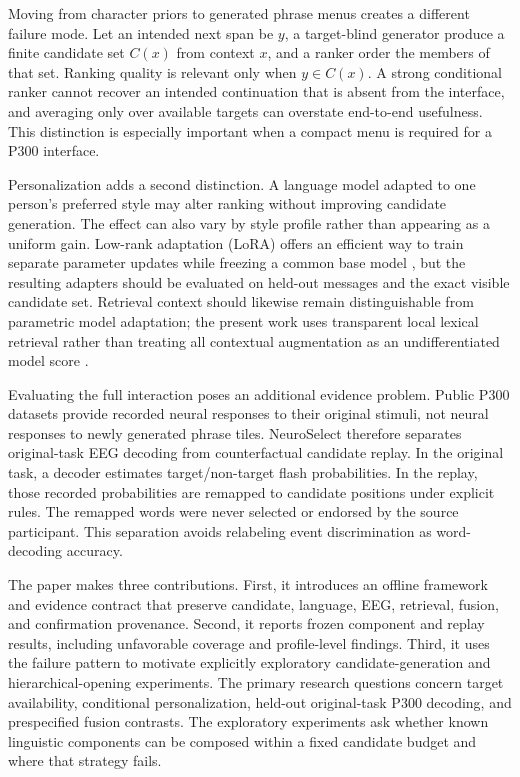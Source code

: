 \documentclass[11pt]{article}
\begin{document}
Moving from character priors to generated phrase menus creates a different failure mode. Let an intended next span be $y$, a target-blind generator produce a finite candidate set $C(x)$ from context $x$, and a ranker order the members of that set. Ranking quality is relevant only when $y \in C(x)$. A strong conditional ranker cannot recover an intended continuation that is absent from the interface, and averaging only over available targets can overstate end-to-end usefulness. This distinction is especially important when a compact menu is required for a P300 interface.


Personalization adds a second distinction. A language model adapted to one person's preferred style may alter ranking without improving candidate generation. The effect can also vary by style profile rather than appearing as a uniform gain. Low-rank adaptation (LoRA) offers an efficient way to train separate parameter updates while freezing a common base model \cite{hu2022}, but the resulting adapters should be evaluated on held-out messages and the exact visible candidate set. Retrieval context should likewise remain distinguishable from parametric model adaptation; the present work uses transparent local lexical retrieval rather than treating all contextual augmentation as an undifferentiated model score \cite{lewis2020}.


Evaluating the full interaction poses an additional evidence problem. Public P300 datasets provide recorded neural responses to their original stimuli, not neural responses to newly generated phrase tiles. NeuroSelect therefore separates original-task EEG decoding from counterfactual candidate replay. In the original task, a decoder estimates target/non-target flash probabilities. In the replay, those recorded probabilities are remapped to candidate positions under explicit rules. The remapped words were never selected or endorsed by the source participant. This separation avoids relabeling event discrimination as word-decoding accuracy.


The paper makes three contributions. First, it introduces an offline framework and evidence contract that preserve candidate, language, EEG, retrieval, fusion, and confirmation provenance. Second, it reports frozen component and replay results, including unfavorable coverage and profile-level findings. Third, it uses the failure pattern to motivate explicitly exploratory candidate-generation and hierarchical-opening experiments. The primary research questions concern target availability, conditional personalization, held-out original-task P300 decoding, and prespecified fusion contrasts. The exploratory experiments ask whether known linguistic components can be composed within a fixed candidate budget and where that strategy fails.
\end{document}
